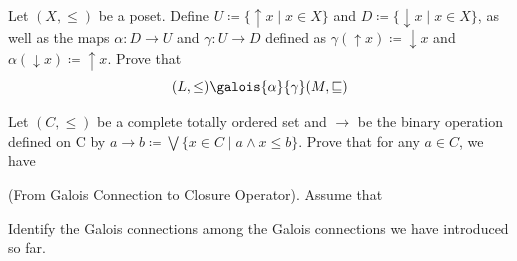 \documentclass[11pt,a4paper]{exam}
\newcommand{\meet}{\wedge}
\newcommand{\bigjoin}{{\textstyle\bigvee}}
\newcommand{\aleq}{\sqsubseteq}
\begin{document}
\begin{exo}
    Let $(X, \leq)$ be a poset. Define $U \coloneqq \{\uparrow x \mid x \in X\}$ and $D \coloneqq \{\downarrow x \mid x \in X\}$, as well as the maps $\alpha \colon D \rightarrow U$ and $\gamma \colon U \rightarrow D$ defined as $\gamma(\uparrow x) \coloneqq \downarrow x$ and $\alpha(\downarrow x) \coloneqq \uparrow x$. Prove that 
    \[
       (L, \leq) \galois{\alpha}{\gamma} (M, \aleq)
    \]

    \begin{sol}
        
    \end{sol}
\end{exo}

\begin{exo}
    Let $(C, \leq)$ be a complete totally ordered set and $\rightarrow$ be the binary operation defined on C by $a \rightarrow b \coloneqq \bigjoin\{x \in C \mid a \meet x \leq b\}$. Prove that for any $a \in C$, we have 

    \begin{sol}
        
    \end{sol}
\end{exo}

\begin{exo}
    (From Galois Connection to Closure Operator). Assume that 

    \begin{sol}
        
    \end{sol}
\end{exo}

\begin{exo}
    Identify the Galois connections among the Galois connections we have introduced so far.

    \begin{sol}
        
    \end{sol}
\end{exo}
\end{document}
